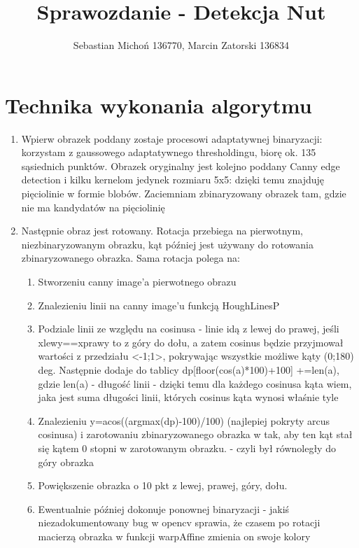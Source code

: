\documentclass[12pt]{article}
\begin{document}
	\title{Sprawozdanie - Detekcja Nut}
	\author{Sebastian Michoń 136770, Marcin Zatorski 136834}
	\date{\vspace{-0ex}}
	\maketitle
	\section{Technika wykonania algorytmu}
	\begin {enumerate}
		\item{Wpierw obrazek poddany zostaje procesowi adaptatywnej binaryzacji: korzystam z gaussowego adaptatywnego thresholdingu, biorę ok. 135 sąsiednich punktów. Obrazek oryginalny jest kolejno poddany 
		Canny edge detection i kilku kernelom jedynek rozmiaru 5x5: dzięki temu znajduję pięciolinie w formie blobów. Zaciemniam zbinaryzowany obrazek tam, gdzie nie ma kandydatów na pięciolinię}
		\item{Następnie obraz jest rotowany. Rotacja przebiega na pierwotnym, niezbinaryzowanym obrazku, kąt później jest używany do rotowania zbinaryzowanego obrazka. Sama rotacja polega na:}
		\begin {enumerate}
			\item{Stworzeniu canny image'a pierwotnego obrazu}
			\item{Znalezieniu linii na canny image'u funkcją HoughLinesP}
			\item{Podziale linii ze względu na cosinusa - linie idą z lewej do prawej, jeśli xlewy==xprawy to z góry do dołu, a zatem cosinus będzie przyjmował wartości z przedziału <-1;1>, pokrywając
			 wszystkie możliwe kąty (0;180) deg. Następnie dodaje do tablicy dp[floor(cos(a)*100)+100] +=len(a), gdzie len(a) - długość linii - dzięki temu dla każdego cosinusa kąta wiem, jaka jest suma długości 
			 linii, których cosinus kąta wynosi właśnie tyle}
			 \item{Znalezieniu y=acos((argmax(dp)-100)/100) (najlepiej pokryty arcus cosinusa) i zarotowaniu zbinaryzowanego obrazka w tak, aby ten kąt stał się kątem 0 stopni w zarotowanym obrazku. - 
			 czyli był równoległy do góry obrazka}
			 \item{Powiększenie obrazka o 10 pkt z lewej, prawej, góry, dołu.}
			 \item{Ewentualnie później dokonuje ponownej binaryzacji - jakiś niezadokumentowany bug w opencv sprawia, że czasem po rotacji macierzą obrazka w funkcji warpAffine zmienia on swoje kolory}

\end{enumerate}
\end{enumerate}
\end{document}
